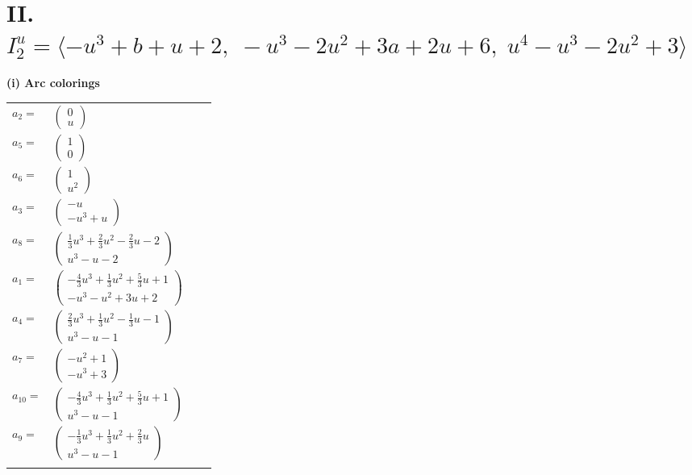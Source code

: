\documentclass[1p]{elsarticle_modified}
\theoremstyle{definition}
\begin{document}
\centering \section*{II. $I^u_{2}= \langle - u^3+b+u+2,\;- u^3-2 u^2+3 a+2 u+6,\;u^4- u^3-2 u^2+3 \rangle$}
\flushleft \textbf{(i) Arc colorings}\\
\begin{tabular}{m{7pt} m{180pt} m{7pt} m{180pt} }
\flushright $a_{2}=$&$\begin{pmatrix}0\\u\end{pmatrix}$ \\
\flushright $a_{5}=$&$\begin{pmatrix}1\\0\end{pmatrix}$ \\
\flushright $a_{6}=$&$\begin{pmatrix}1\\u^2\end{pmatrix}$ \\
\flushright $a_{3}=$&$\begin{pmatrix}- u\\- u^3+u\end{pmatrix}$ \\
\flushright $a_{8}=$&$\begin{pmatrix}\frac{1}{3} u^3+\frac{2}{3} u^2-\frac{2}{3} u-2\\u^3- u-2\end{pmatrix}$ \\
\flushright $a_{1}=$&$\begin{pmatrix}-\frac{4}{3} u^3+\frac{1}{3} u^2+\frac{5}{3} u+1\\- u^3- u^2+3 u+2\end{pmatrix}$ \\
\flushright $a_{4}=$&$\begin{pmatrix}\frac{2}{3} u^3+\frac{1}{3} u^2-\frac{1}{3} u-1\\u^3- u-1\end{pmatrix}$ \\
\flushright $a_{7}=$&$\begin{pmatrix}- u^2+1\\- u^3+3\end{pmatrix}$ \\
\flushright $a_{10}=$&$\begin{pmatrix}-\frac{4}{3} u^3+\frac{1}{3} u^2+\frac{5}{3} u+1\\u^3- u-1\end{pmatrix}$ \\
\flushright $a_{9}=$&$\begin{pmatrix}-\frac{1}{3} u^3+\frac{1}{3} u^2+\frac{2}{3} u\\u^3- u-1\end{pmatrix}$\\&\end{tabular}
\end{document}
